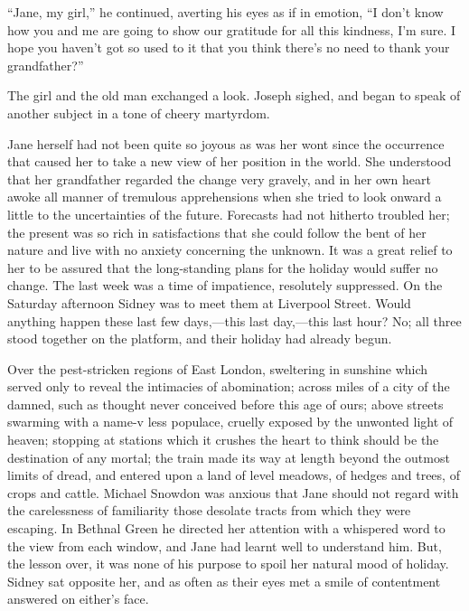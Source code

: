 ``Jane, my girl,'' he continued, averting his eyes as if in emotion, ``I
don't know how you and me are going to show our gratitude for all this
kindness, I'm sure. I hope you haven't got so used to it that you think
there's no need to thank your grandfather?''

The girl and the old man exchanged a {}look. Joseph sighed, and began to
speak of another subject in a tone of cheery martyrdom.

Jane herself had not been quite so joyous as was her wont since the
occurrence that caused her to take a new view of her position in the
world. She understood that her grandfather regarded the change very
gravely, and in her own heart awoke all manner of tremulous
apprehensions when she tried to look onward a little to the
uncertainties of the future. Forecasts had not hitherto troubled her;
the present was so rich in satisfactions that she could follow the bent
of her nature and live with no anxiety concerning the unknown. It was a
great relief to her to be assured that the long-standing plans for the
holiday would suffer no change. The last week was a time of impatience,
resolutely suppressed. On the Saturday afternoon Sidney was to meet them
at Liverpool Street. Would anything happen these last few days,---this
last day,---this last hour? No; all three stood together on the
platform, and their holiday had already begun.

{}Over the pest-stricken regions of East London, sweltering in sunshine
which served only to reveal the intimacies of abomination; across miles
of a city of the damned, such as thought never conceived before this age
of ours; above streets swarming with a name-v less populace, cruelly
exposed by the unwonted light of heaven; stopping at stations which it
crushes the heart to think should be the destination of any mortal; the
train made its way at length beyond the outmost limits of dread, and
entered upon a land of level meadows, of hedges and trees, of crops and
cattle. Michael Snowdon was anxious that Jane should not regard with the
carelessness of familiarity those desolate tracts from which they were
escaping. In Bethnal Green he directed her attention with a whispered
word to the view from each window, and Jane had learnt well to
understand him. But, the lesson over, it was none of his purpose to
spoil her natural mood of holiday. Sidney sat opposite her, and as often
as their eyes met a smile of contentment answered on either's face.

